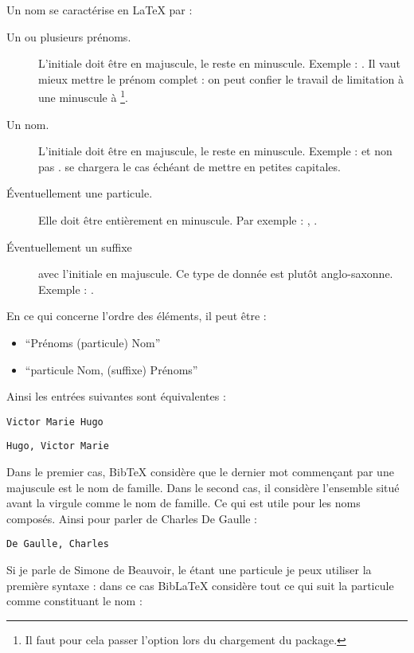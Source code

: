Un nom se caractérise en LaTeX par :
\begin{description}
	\item[Un ou plusieurs prénoms.]L'initiale doit être en majuscule, le reste en minuscule. Exemple : . Il vaut mieux mettre le prénom complet : on peut confier le travail de limitation à une minuscule  à \footnote{Il faut pour cela passer l'option  lors du chargement du package.}.
	\item[Un nom.]L'initiale doit être en majuscule, le reste en minuscule. Exemple :  et non pas .  se chargera le cas échéant de mettre en petites capitales.
	\item[Éventuellement une particule.]Elle doit être entièrement en minuscule. Par exemple : , .
	\item[Éventuellement un suffixe] avec l'initiale en majuscule. Ce type de donnée est plutôt anglo-saxonne. Exemple : .
\end{description}

En ce qui concerne l'ordre des éléments, il  peut être :
\begin{itemize}
\item\enquote{Prénoms  (particule)  Nom}
\item\enquote{particule Nom, (suffixe) Prénoms} 
\end{itemize}

Ainsi les entrées suivantes sont équivalentes :

\begin{verbatim}
Victor Marie Hugo
\end{verbatim}

\begin{verbatim}
Hugo, Victor Marie
\end{verbatim}

Dans le premier cas, BibTeX considère que le dernier mot commençant par une majuscule est le nom de famille. Dans le second cas, il considère l'ensemble situé avant la virgule comme le nom de famille. Ce qui est utile pour les noms composés. Ainsi pour parler de Charles De Gaulle :

\begin{verbatim}
De Gaulle, Charles
\end{verbatim}

Si je parle de Simone de Beauvoir, le  étant une particule je peux utiliser la première syntaxe : dans ce cas BibLaTeX considère tout ce qui suit la particule comme constituant le nom :

